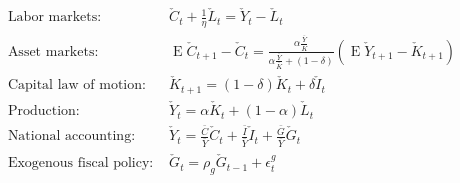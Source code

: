 \documentclass[11pt]{article}
\DeclareMathOperator{\ev}{E}
\begin{document}
        \begin{align*}
            \text{Labor markets:~} & \check{C}_t + \frac{1}{\eta} \check{L}_t = \check{Y}_t - \check{L}_t \\
            \text{Asset markets:~} & \ev \check{C}_{t+1} - \check{C}_t = \frac{\alpha \frac{\bar{Y}}{\bar{K}}}{\alpha \frac{\bar{Y}}{\bar{K}} + (1-\delta)} (\ev \check{Y}_{t+1} - \check{K}_{t+1} ) \\
            \text{Capital law of motion:~} & \check{K}_{t+1} = (1-\delta) \check{K}_t + \delta \check{I}_t \\
            \text{Production:~} & \check{Y}_t = \alpha \check{K}_t + (1-\alpha) \check{L}_t \\
            \text{National accounting:~} & \check{Y}_t = \frac{\bar{C}}{\bar{Y}} \check{C}_t + \frac{\bar{I}}{\bar{Y}} \check{I}_t + \frac{\bar{G}}{\bar{Y}} \check{G}_t \\
            \text{Exogenous fiscal policy:~} & \check{G}_t = \rho_g \check{G}_{t-1} + \epsilon_t^g
        \end{align*}
\end{document}
